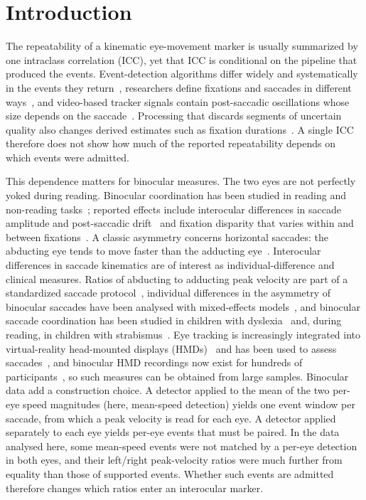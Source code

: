 \section{Introduction}

The repeatability of a kinematic eye-movement marker is usually summarized by one intraclass correlation (ICC), yet that ICC is conditional on the pipeline that produced the events. Event-detection algorithms differ widely and systematically in the events they return~\citep{andersson2017,birawo2022,syscls2026}, researchers define fixations and saccades in different ways~\citep{hessels2018}, and video-based tracker signals contain post-saccadic oscillations whose size depends on the saccade~\citep{hooge2015}. Processing that discards segments of uncertain quality also changes derived estimates such as fixation durations~\citep{wass2013}. A single ICC therefore does not show how much of the reported repeatability depends on which events were admitted.

This dependence matters for binocular measures. The two eyes are not perfectly yoked during reading. Binocular coordination has been studied in reading and non-reading tasks~\citep{liversedge2006,kirkby2008}; reported effects include interocular differences in saccade amplitude and post-saccadic drift~\citep{vernet2009} and fixation disparity that varies within and between fixations~\citep{nuthmann2009}. A classic asymmetry concerns horizontal saccades: the abducting eye tends to move faster than the adducting eye~\citep{collewijn1988}. Interocular differences in saccade kinematics are of interest as individual-difference and clinical measures. Ratios of abducting to adducting peak velocity are part of a standardized saccade protocol~\citep{nijbijvank2018}, individual differences in the asymmetry of binocular saccades have been analysed with mixed-effects models~\citep{kloke2006}, and binocular saccade coordination has been studied in children with dyslexia~\citep{bucci2008,jainta2011} and, during reading, in children with strabismus~\citep{lions2013}. Eye tracking is increasingly integrated into virtual-reality head-mounted displays (HMDs)~\citep{adhanom2023} and has been used to assess saccades~\citep{imaoka2020}, and binocular HMD recordings now exist for hundreds of participants~\citep{lohr2023}, so such measures can be obtained from large samples. Binocular data add a construction choice. A detector applied to the mean of the two per-eye speed magnitudes (here, mean-speed detection) yields one event window per saccade, from which a peak velocity is read for each eye. A detector applied separately to each eye yields per-eye events that must be paired. In the data analysed here, some mean-speed events were not matched by a per-eye detection in both eyes, and their left/right peak-velocity ratios were much further from equality than those of supported events. Whether such events are admitted therefore changes which ratios enter an interocular marker.


